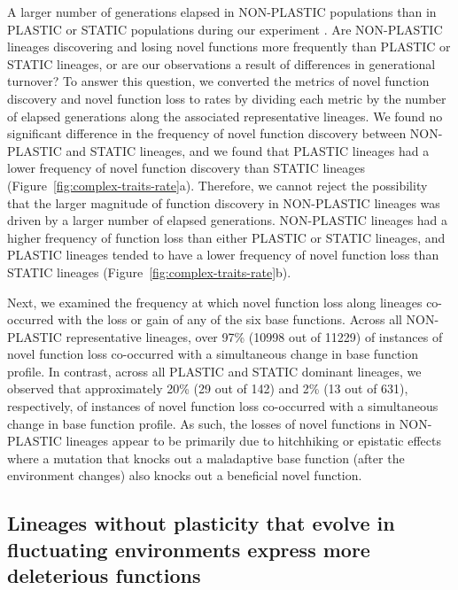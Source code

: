 \begin{raggedbottom}
A larger number of generations elapsed in NON-PLASTIC populations than in PLASTIC or STATIC populations during our experiment \citep{supplemental_material}.
Are NON-PLASTIC lineages discovering and losing novel functions more frequently than PLASTIC or STATIC lineages, or are our observations a result of differences in generational turnover?
To answer this question, we converted the metrics of novel function discovery and novel function loss to rates by dividing each metric by the number of elapsed generations along the associated representative lineages.
We found no significant difference in the frequency of novel function discovery between NON-PLASTIC and STATIC lineages, and we found that PLASTIC lineages had a lower frequency of novel function discovery than STATIC lineages (Figure~\ref{fig:complex-traits-rate}a).
Therefore, we cannot reject the possibility that the larger magnitude of function discovery in NON-PLASTIC lineages was driven by a larger number of elapsed generations.
NON-PLASTIC lineages had a higher frequency of function loss than either PLASTIC or STATIC lineages, and PLASTIC lineages tended to have a lower frequency of novel function loss than STATIC lineages (Figure~\ref{fig:complex-traits-rate}b).


Next, we examined the frequency at which novel function loss along lineages co-occurred with the loss or gain of any of the six base functions.
Across all NON-PLASTIC representative lineages, over 97\% (10998 out of 11229) of instances of novel function loss co-occurred with a simultaneous change in base function profile.
In contrast, across all PLASTIC and STATIC dominant lineages, we observed that approximately 20\% (29 out of 142) and 2\% (13 out of 631), respectively, of instances of novel function loss co-occurred with a simultaneous change in base function profile.
As such, the losses of novel functions in NON-PLASTIC lineages appear to be primarily due to hitchhiking or epistatic effects where a mutation that knocks out a maladaptive base function (after the environment changes) also knocks out a beneficial novel function.

\subsection{Lineages without plasticity that evolve in fluctuating environments express more deleterious functions}



\end{raggedbottom}

